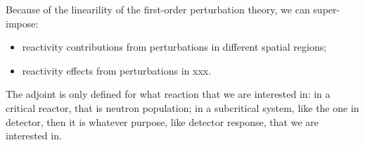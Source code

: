 \documentclass{school-22.211-notes}
\begin{document}
Because of the linearility of the first-order perturbation theory, we can super-impose: 
\begin{itemize}
\item reactivity contributions from perturbations in different spatial regions;
\item reactivity effects from perturbations in xxx. 
\end{itemize}


 The adjoint is only defined for what reaction that we are interested in: in a critical reactor, that is neutron population; in a subcritical system, like the one in detector, then it is whatever purpose, like detector response, that we are interested in. 
\end{document}
